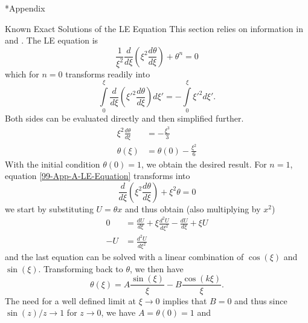 \begin{appendix}
\renewcommand{\thesection}{\Alph{section}}
\renewcommand{\thesubsection}{\Alph{subsection}}
\renewcommand\thetheorem{\thesubsection.\arabic{theorem}}

\begin{section}*{Appendix}
%
%
\begin{subsection}{Known Exact Solutions of the LE Equation}
\label{99-App-A-Exact-LE-Solutions}
This section relies on information in \cite{weissteinLaneEmdenDifferentialEquation2020} and \cite{chandrasekharChandrasekharAnIntroductionStudy1958}. The LE equation is
\begin{equation}
	\frac{1}{\xi^2}\frac{d}{d\xi}\left(\xi^2\frac{d\theta}{d\xi}\right)+\theta^n=0
	\label{99-App-A-LE-Equation}
\end{equation}
which for $n=0$ transforms readily into
\begin{equation}
	\int\limits_0^\xi\frac{d}{d\xi}\left(\xi'^2\frac{d\theta}{d\xi}\right)d\xi' = -\int\limits_0^\xi\xi'^2d\xi'.
\end{equation}
Both sides can be evaluated directly and then simplified further.
\begin{align}
	\xi^2\frac{d\theta}{d\xi} &= -\frac{\xi^3}{3}\\
	\theta(\xi) &= \theta(0)-\frac{\xi^2}{6}
\end{align}
With the initial condition $\theta(0)=1$, we obtain the desired result. For $n=1$, equation \ref{99-App-A-LE-Equation} transforms into
\begin{equation}
	\frac{d}{d\xi}\left(\xi^2\frac{d\theta}{d\xi}\right)+\xi^2\theta=0
\end{equation}
we start by substituting $U=\theta x$ and thus obtain (also multiplying by $x^2$)
\begin{align}
	0 &= \frac{dU}{d\xi} + \xi\frac{d^2U}{d\xi^2} - \frac{dU}{d\xi} + \xi U\\
	-U &= \frac{d^2U}{d\xi^2}
\end{align}
and the last equation can be solved with a linear combination of $\cos(\xi)$ and $\sin(\xi)$. Transforming back to $\theta$, we then have
\begin{equation}
	\theta(\xi) = A\frac{\sin(\xi)}{\xi} - B\frac{\cos(k\xi)}{\xi}.
\end{equation}
The need for a well defined limit at $\xi\rightarrow0$ implies that $B=0$ and thus since $\sin(z)/z\rightarrow1$ for $z\rightarrow0$, we have $A=\theta(0)=1$ and 
\begin{equation}

\end{equation}
\end{subsection}
\end{section}
\end{appendix}
